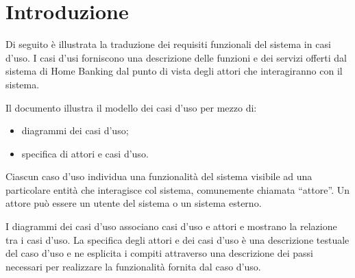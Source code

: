 \section{Introduzione}

Di seguito \`e illustrata la traduzione dei requisiti funzionali del sistema in casi d'uso.
I casi d'usi forniscono una descrizione delle funzioni e dei servizi offerti dal sistema di Home Banking dal punto di vista degli attori che interagiranno con il sistema.

Il documento illustra il modello dei casi d'uso per mezzo di:
\begin{itemize}
	\item diagrammi dei casi d'uso;
	\item specifica di attori e casi d'uso.
\end{itemize}

Ciascun caso d'uso individua una funzionalit\`a del sistema visibile ad una particolare entit\`a che interagisce col sistema, comunemente chiamata ``attore''.
Un attore pu\`o essere un utente del sistema o un sistema esterno.

I diagrammi dei casi d'uso associano casi d'uso e attori e mostrano la relazione tra i casi d'uso.
La specifica degli attori e dei casi d'uso \`e una descrizione testuale del caso d'uso e ne esplicita i compiti attraverso una descrizione dei passi necessari per realizzare la funzionalit\`a fornita dal caso d'uso.

